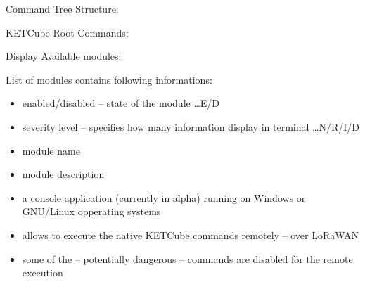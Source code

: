 \begin{frame}%
  Command Tree Structure:

  \terminalCommandStructure
  
  KETCube Root Commands:
  
  \terminalRootCommands

\end{frame}



\begin{frame}%
  Display Available modules:
  
  \moduleListCommand
  
  \scriptsize
  List of modules contains following informations:
  \begin{itemize}
    \item enabled/disabled -- state of the module \dots E/D
    \item severity level -- specifies how many information display in terminal \dots N/R/I/D
    \item module name
    \item module description
  \end{itemize}
  
\end{frame}



\begin{frame}%
    
  \begin{itemize}
    \item a console application (currently in alpha) running on Windows or GNU/Linux opperating systems
    \item allows to execute the native KETCube commands remotely -- over LoRaWAN
    \item some of the -- potentially dangerous -- commands are disabled for the remote execution
  \end{itemize}
  
\end{frame}


